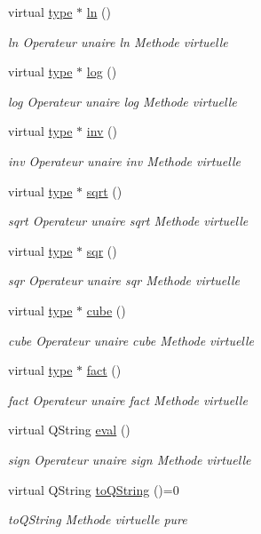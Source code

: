 \begin{DoxyCompactItemize}
virtual \hyperlink{classtype}{type} $\ast$ \hyperlink{classtype_aba57b52b37f984806842df5478b2489c}{ln} ()
\begin{DoxyCompactList}\small\item\em ln Operateur unaire ln Methode virtuelle \end{DoxyCompactList}\item 
virtual \hyperlink{classtype}{type} $\ast$ \hyperlink{classtype_ab02a7131b07f81a545beb9ae499bcef6}{log} ()
\begin{DoxyCompactList}\small\item\em log Operateur unaire log Methode virtuelle \end{DoxyCompactList}\item 
virtual \hyperlink{classtype}{type} $\ast$ \hyperlink{classtype_af4bf1a878929fb77f6e1edf90d33a275}{inv} ()
\begin{DoxyCompactList}\small\item\em inv Operateur unaire inv Methode virtuelle \end{DoxyCompactList}\item 
virtual \hyperlink{classtype}{type} $\ast$ \hyperlink{classtype_aedd0df2ba42b6cb66ee3dba28309a47b}{sqrt} ()
\begin{DoxyCompactList}\small\item\em sqrt Operateur unaire sqrt Methode virtuelle \end{DoxyCompactList}\item 
virtual \hyperlink{classtype}{type} $\ast$ \hyperlink{classtype_a70b655b274b3378154cd29127c22a4f0}{sqr} ()
\begin{DoxyCompactList}\small\item\em sqr Operateur unaire sqr Methode virtuelle \end{DoxyCompactList}\item 
virtual \hyperlink{classtype}{type} $\ast$ \hyperlink{classtype_ac470662477ea88722b58e98fee3e1ec0}{cube} ()
\begin{DoxyCompactList}\small\item\em cube Operateur unaire cube Methode virtuelle \end{DoxyCompactList}\item 
virtual \hyperlink{classtype}{type} $\ast$ \hyperlink{classtype_adfeadf5e6478f3687bcaba9cf9aaf8d9}{fact} ()
\begin{DoxyCompactList}\small\item\em fact Operateur unaire fact Methode virtuelle \end{DoxyCompactList}\item 
virtual Q\-String \hyperlink{classtype_a8288e5361dba59212d1f2490f6531793}{eval} ()
\begin{DoxyCompactList}\small\item\em sign Operateur unaire sign Methode virtuelle \end{DoxyCompactList}\item 
virtual Q\-String \hyperlink{classtype_ab61f01d56f3896cc99788a1a18c4b0c2}{to\-Q\-String} ()=0
\begin{DoxyCompactList}\small\item\em to\-Q\-String Methode virtuelle pure \end{DoxyCompactList}\end{DoxyCompactItemize}
